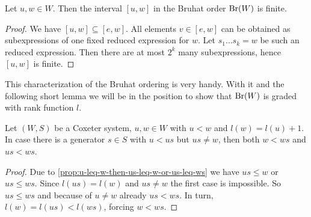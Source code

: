 \begin{coro}
	Let $u,w \in W$. Then the interval $[u,w]$ in the Bruhat order $\operatorname{Br}(W)$ is finite.

	\begin{proof}
		We have $[u,w] \subseteq [e,w]$. All elements $v \in [e,w]$ can be obtained as subexpressions of one fixed reduced expression for $w$. Let $s_1 \ldots s_k = w$ be such an reduced expression. Then there are at most $2^k$ many subexpressions, hence $[u,w]$ is finite.
	\end{proof}
\end{coro}

This characterization of the Bruhat ordering is very handy. With it and the following short lemma we will be in the position to show that $\operatorname{Br}(W)$ is graded with rank function $l$.

\begin{lemm}
	Let $(W,S)$ be a Coxeter system, $u,w \in W$ with $u < w$ and $l(w) = l(u) + 1$. In case there is a generator $s \in S$ with $u < us$ but $us \neq w$, then both $w < ws$ and $us < ws$.

	\begin{proof}
		Due to \ref{prop:u-leq-w-then-us-leq-w-or-us-leq-ws} we have $us \leq w$ or $us \leq ws$. Since $l(us) = l(w)$ and $us \neq w$ the first case is impossible. So $us \leq ws$ and because of $u \neq w$ already $us < ws$. In turn, $l(w) = l(us) < l(ws)$, forcing $w < ws$.
	\end{proof}
\end{lemm}

